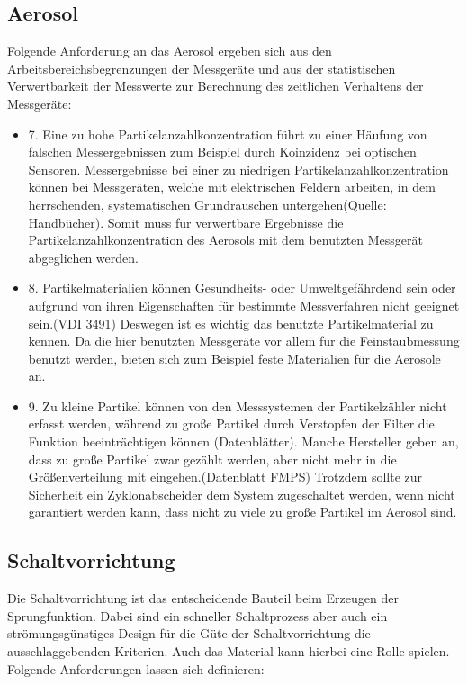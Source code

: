 \subsection{Aerosol}
Folgende Anforderung an das Aerosol ergeben sich aus den Arbeitsbereichsbegrenzungen der Messger\"{a}te und aus der statistischen Verwertbarkeit der Messwerte zur Berechnung des zeitlichen Verhaltens der Messger\"{a}te:

\begin{itemize}
\item 7. Eine zu hohe Partikelanzahlkonzentration führt zu einer H\"{a}ufung von falschen Messergebnissen zum Beispiel durch Koinzidenz bei optischen Sensoren. Messergebnisse bei einer zu niedrigen Partikelanzahlkonzentration k\"{o}nnen bei Messger\"{a}ten, welche mit elektrischen Feldern arbeiten, in dem herrschenden, systematischen Grundrauschen untergehen(Quelle: Handb\"{u}cher). Somit muss f\"{u}r verwertbare Ergebnisse die Partikelanzahlkonzentration des Aerosols mit dem benutzten Messgerät abgeglichen werden.

\item 8. Partikelmaterialien k\"{o}nnen Gesundheits- oder Umweltgef\"{a}hrdend sein oder aufgrund von ihren Eigenschaften f\"{u}r bestimmte Messverfahren nicht geeignet sein.(VDI 3491) Deswegen ist es wichtig das benutzte Partikelmaterial zu kennen. Da die hier benutzten Messgeräte vor allem für die Feinstaubmessung benutzt werden, bieten sich zum Beispiel feste Materialien für die Aerosole an.

\item 9. Zu kleine Partikel k\"{o}nnen von den Messsystemen der Partikelz\"{a}hler nicht erfasst werden, w\"{a}hrend zu gro{\ss}e Partikel durch Verstopfen der Filter die Funktion beeintr\"{a}chtigen k\"{o}nnen (Datenbl\"{a}tter). Manche Hersteller geben an, dass zu große Partikel zwar gez\"{a}hlt werden, aber nicht mehr in die Gr\"{o}{\ss}enverteilung mit eingehen.(Datenblatt FMPS) Trotzdem sollte zur Sicherheit ein Zyklonabscheider dem System zugeschaltet werden, wenn nicht garantiert werden kann, dass nicht zu viele zu gro{\ss}e Partikel im Aerosol sind.
\end{itemize}

\subsection{Schaltvorrichtung}
Die Schaltvorrichtung ist das entscheidende Bauteil beim Erzeugen der Sprungfunktion. Dabei sind ein schneller Schaltprozess aber auch ein str\"{o}mungsg\"{u}nstiges Design für die G\"{u}te der Schaltvorrichtung die ausschlaggebenden Kriterien. Auch das Material kann hierbei eine Rolle spielen. Folgende Anforderungen lassen sich definieren:

